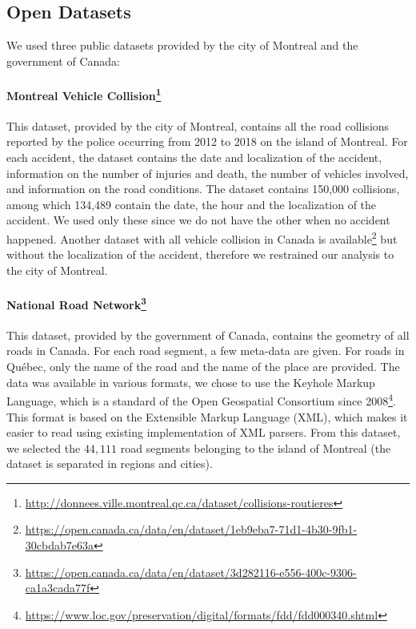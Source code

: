 \documentclass[conference]{IEEEtran}
\newcommand{\english}[1]{\uwave{#1}}  %
\begin{document}
\subsection{Open Datasets}
\label{sec:datasets}

We used three public datasets provided by the city of Montreal and the government of Canada: 

\paragraph{Montreal Vehicle Collision\protect\footnote{\url{http://donnees.ville.montreal.qc.ca/dataset/collisions-routieres}}}

This dataset, provided by the city of Montreal, contains all the road
collisions reported by the police occurring from 2012 to 2018 on the island
of Montreal. For each accident, the dataset contains the date and
localization of the accident, information on the number of injuries and
death, the number of vehicles involved, and information on the road
conditions. The dataset contains 150,000 collisions, among which 134,489
contain the date, the hour and the localization of the accident. We used
only these \english{pieces of information} since we do not have the other \english{pieces
of information} when no accident happened.
Another dataset with all vehicle collision in Canada is available\footnote{\protect\url{https://open.canada.ca/data/en/dataset/1eb9eba7-71d1-4b30-9fb1-30cbdab7e63a}} but
without the localization of the accident, therefore we restrained our
analysis to the city of Montreal.

\paragraph{National Road Network\protect\footnote{\url{https://open.canada.ca/data/en/dataset/3d282116-e556-400c-9306-ca1a3cada77f}}}

This dataset, provided by the government of Canada, contains the geometry of
all roads in Canada. For each road segment, a few meta-data are given. For
roads in Québec, only the name of the road and the name of the place are provided. The
data was available in various formats, we chose to use the Keyhole Markup
Language, which is a standard of the Open Geospatial Consortium since 2008\protect\footnote{\url{https://www.loc.gov/preservation/digital/formats/fdd/fdd000340.shtml}}. 
This format is based on the Extensible Markup Language (XML), which makes it
easier to read using existing implementation of XML parsers. From this
dataset, we selected the $44,111$ road segments belonging to the island of
Montreal (the dataset is separated in regions and cities).
\end{document}
